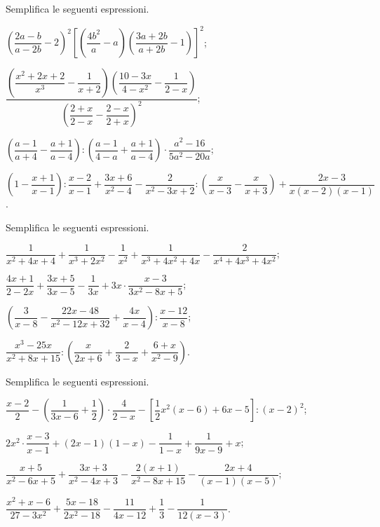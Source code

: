 \begin{esercizio}[\Ast]
\label{ese:14.44}
Semplifica le seguenti espressioni.
\begin{enumeratea}
 \item $\left(\dfrac{2a-b}{a-2b}-2\right)^{2}\left[\left(\dfrac{4b^{2}}{a}-a\right)\left(\dfrac{3a+2b}{a+2b}-1\right)\right]^{2}$;
 \item $\dfrac{\left(\dfrac{x^{2}+2x+2}{x^{3}}-\dfrac{1}{x+2}\right)\left(\dfrac{10-3x}{4-x^{2}}-\dfrac{1}{2-x}\right)}{\left(\dfrac{2+x}{2-x}-\dfrac{2-x}{2+x}\right)^{2}}$;
 \item $\left(\dfrac{a-1}{a+4}-\dfrac{a+1}{a-4}\right):\left(\dfrac{a-1}{4-a}+\dfrac{a+1}{a-4}\right)\cdot {\dfrac{a^{2}-16}{5a^{2}-20a}}$;
 \item $\left(1-\dfrac{x+1}{x-1}\right):\dfrac{x-2}{x-1}+\dfrac{3x+6}{x^{2}-4}-\dfrac{2}{x^{2}-3x+2}: {\left(\dfrac{x}{x-3}-\dfrac{x}{x+3}\right)}+\dfrac{2x-3}{x(x-2)(x-1)}$.
\end{enumeratea}
\end{esercizio}
\pagebreak

\begin{esercizio}[\Ast]
\label{ese:14.45}
Semplifica le seguenti espressioni.
\begin{enumeratea}
 \item $\dfrac{1}{x^{2}+4x+4}+\dfrac{1}{x^{3}+2x^{2}}-\dfrac{1}{x^{2}}+\dfrac{1}{x^{3}+4x^{2}+4x}-\dfrac{2}{x^{4}+4x^{3}+4x^{2}}$;
 \item $\dfrac{4x+1}{2-2x}+\dfrac{3x+5}{3x-5}-\dfrac{1}{3x}+3x\cdot {\dfrac{x-3}{3x^{2}-8x+5}}$;
 \item $\left(\dfrac{3}{x-8}-\dfrac{22x-48}{x^{2}-12x+32}+\dfrac{4x}{x-4}\right):\dfrac{x-12}{x-8}$;
 \item $\dfrac{x^{{3}}-25x}{x^{{2}}+8x+15}:\left(\dfrac{x}{2x+6}+\dfrac{2}{3-x}+\dfrac{6+x}{x^{{2}}-9}\right)$.
\end{enumeratea}
\end{esercizio}

\begin{esercizio}[\Ast]
\label{ese:14.46}
Semplifica le seguenti espressioni.
\begin{enumeratea}
 \item $\dfrac{x-2}{2}-\left(\dfrac{1}{3x-6}+\dfrac{1}{2}\right)\cdot {\dfrac{4}{2-x}}-\left[\dfrac{1}{2}x^{2}(x-6)+6x-5\right]:(x-2)^{2}$;
 \item $2x^{2}\cdot {\dfrac{x-3}{x-1}}+(2x-1)(1-x)-\dfrac{1}{1-x}+\dfrac{1}{9x-9}+x$;
 \item $\dfrac{x+5}{x^{2}-6x+5}+\dfrac{3x+3}{x^{2}-4x+3}-\dfrac{2(x+1)}{x^{2}-8x+15}-\dfrac{2x+4}{(x-1)(x-5)}$;
 \item $\dfrac{x^{2}+x-6}{27-3x^{2}}+\dfrac{5x-18}{2x^{2}-18}-\dfrac{11}{4x-12}+\dfrac{1}{3}-\dfrac{1}{12(x-3)}$.
\end{enumeratea}
\end{esercizio}

